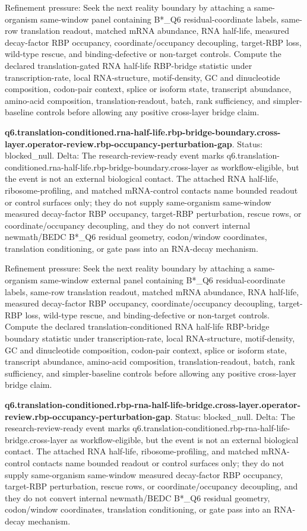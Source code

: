Refinement pressure: Seek the next reality boundary by attaching a same-organism same-window panel containing B*\_Q6 residual-coordinate labels, same-row translation readout, matched mRNA abundance, RNA half-life, measured decay-factor RBP occupancy, coordinate/occupancy decoupling, target-RBP loss, wild-type rescue, and binding-defective or non-target controls. Compute the declared translation-gated RNA half-life RBP-bridge statistic under transcription-rate, local RNA-structure, motif-density, GC and dinucleotide composition, codon-pair context, splice or isoform state, transcript abundance, amino-acid composition, translation-readout, batch, rank sufficiency, and simpler-baseline controls before allowing any positive cross-layer bridge claim.

\textbf{q6.translation-conditioned.rna-half-life.rbp-bridge-boundary.cross-layer.operator-review.rbp-occupancy-perturbation-gap}. Status: blocked\_null. Delta: The research-review-ready event marks q6.translation-conditioned.rna-half-life.rbp-bridge-boundary.cross-layer as workflow-eligible, but the event is not an external biological contact. The attached RNA half-life, ribosome-profiling, and matched mRNA-control contacts name bounded readout or control surfaces only; they do not supply same-organism same-window measured decay-factor RBP occupancy, target-RBP perturbation, rescue rows, or coordinate/occupancy decoupling, and they do not convert internal newmath/BEDC B*\_Q6 residual geometry, codon/window coordinates, translation conditioning, or gate pass into an RNA-decay mechanism.

Refinement pressure: Seek the next reality boundary by attaching a same-organism same-window external panel containing B*\_Q6 residual-coordinate labels, same-row translation readout, matched mRNA abundance, RNA half-life, measured decay-factor RBP occupancy, coordinate/occupancy decoupling, target-RBP loss, wild-type rescue, and binding-defective or non-target controls. Compute the declared translation-conditioned RNA half-life RBP-bridge boundary statistic under transcription-rate, local RNA-structure, motif-density, GC and dinucleotide composition, codon-pair context, splice or isoform state, transcript abundance, amino-acid composition, translation-readout, batch, rank sufficiency, and simpler-baseline controls before allowing any positive cross-layer bridge claim.

\textbf{q6.translation-conditioned.rbp-rna-half-life-bridge.cross-layer.operator-review.rbp-occupancy-perturbation-gap}. Status: blocked\_null. Delta: The research-review-ready event marks q6.translation-conditioned.rbp-rna-half-life-bridge.cross-layer as workflow-eligible, but the event is not an external biological contact. The attached RNA half-life, ribosome-profiling, and matched mRNA-control contacts name bounded readout or control surfaces only; they do not supply same-organism same-window measured decay-factor RBP occupancy, target-RBP perturbation, rescue rows, or coordinate/occupancy decoupling, and they do not convert internal newmath/BEDC B*\_Q6 residual geometry, codon/window coordinates, translation conditioning, or gate pass into an RNA-decay mechanism.

